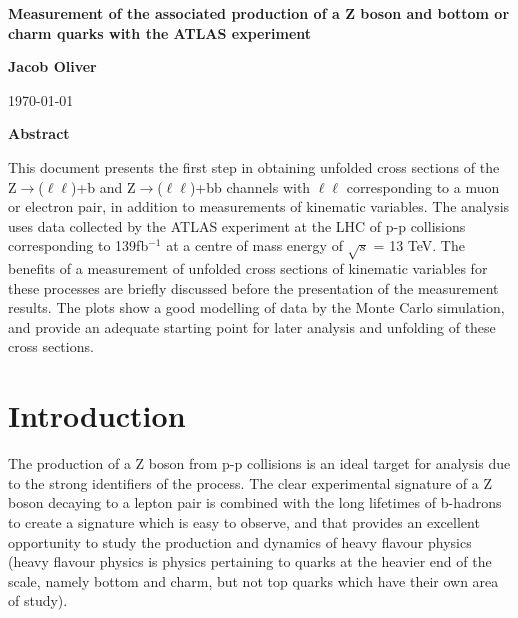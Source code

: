 \documentclass[12pt,a4paper,epsf,portrait,times,epsfig]{article}
\begin{document}
	\begin{center}
		{\Large \bf Measurement of the associated production of a Z boson and bottom or charm quarks with the ATLAS experiment}
	\end{center}
		
		\vspace{3.0cm}
		
	\begin{center}
		{\Large \bf Jacob Oliver}
	\end{center}

		\vspace{1.5cm}
		
	\begin{center}
		\today
	\end{center}
		
		\vspace{3.0cm}
		
		
	\begin{center}
		{\large \bf Abstract}
	\end{center}
	This document presents the first step in obtaining unfolded cross sections of the Z$\rightarrow$($\ell\ell$)+b and Z$\rightarrow$($\ell\ell$)+bb channels with $\ell\ell$ corresponding to a muon or electron pair, in addition to measurements of kinematic variables. The analysis uses data collected by the ATLAS experiment at the LHC of p-p collisions corresponding to 139fb$^{-1}$ at a centre of mass energy of $\sqrt{s}$ = 13 TeV. The benefits of a measurement of unfolded cross sections of kinematic variables for these processes are briefly discussed before the presentation of the measurement results. The plots show a good modelling of data by the Monte Carlo simulation, and provide an adequate starting point for later analysis and unfolding of these cross sections.   
	
	\newpage
	\tableofcontents
	\newpage
	
	\section{Introduction}
	
	The production of a Z boson from p-p collisions is an ideal target for analysis due to the strong identifiers of the process. The clear experimental signature of a Z boson decaying to a lepton pair is combined with the long lifetimes of b-hadrons to create a signature which is easy to observe, and that provides an excellent opportunity to study the production and dynamics of heavy flavour physics (heavy flavour physics is physics pertaining to quarks at the heavier end of the scale, namely bottom and charm, but not top quarks which have their own area of study). \par
	
\end{document}
